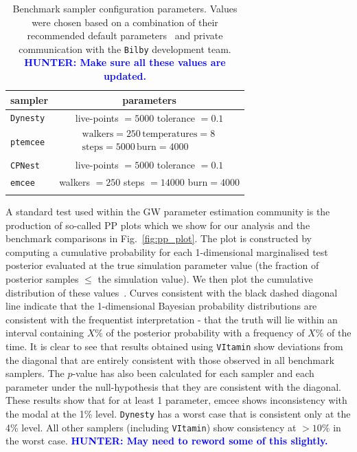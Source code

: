 \documentclass[%
showpacs,
nofootinbib,
 amsmath,amssymb,
 aps,
 twocolumn,
 prl,
 reprint,
floatfix,
]{revtex4-1}
\newcommand{\hunter}[1]{\textbf{\textcolor{blue}{HUNTER: #1}}}
\begin{document}
%
%
\begin{table}
\centering
\caption{Benchmark sampler configuration parameters. Values were chosen based
on a combination of their recommended default parameters~\cite{1811.02042} and
private communication with the \texttt{Bilby} development team.  \hunter{Make sure 
all these values are updated.}}
\begin{tabular}[t]{lc}
\toprule
sampler & parameters \\
\hline
\texttt{Dynesty}~\cite{dynesty} & live-points $=5000$ tolerance $=0.1$ \\
\texttt{ptemcee}~\cite{ptemcee} & $\begin{array}{c}\text{walkers}=250\,
\text{temperatures}=8\,
\\ \text{steps}=5000\, \text{burn}=4000\end{array}$ \\
\texttt{CPNest}~\cite{cpnest} & live-points $=5000$ tolerance $=0.1$ \\
\texttt{emcee}~\cite{emcee} & walkers $=250$ steps $=14000$ burn$=4000$ \\
\botrule
\end{tabular}
\label{Tab:sampler_params}
\end{table}

%
%
A standard test used within the \ac{GW} parameter estimation community is the
production of so-called \ac{PP} plots which we show for our analysis and
the benchmark comparisons in Fig.~\ref{fig:pp_plot}. The plot is constructed
by computing a cumulative probability for each 1-dimensional marginalised
test posterior evaluated at the true simulation parameter value (the fraction
of posterior samples $\leq$ the simulation value). We then plot the
cumulative distribution of these values~\cite{1409.7215}. Curves consistent
with the black dashed diagonal line indicate that the 1-dimensional Bayesian
probability distributions are consistent with the frequentist interpretation -
that the truth will lie within an interval containing $X\%$ of the posterior
probability with a frequency of $X\%$ of the time. It is clear to see that
results obtained using \texttt{VItamin} show deviations from the diagonal
that are entirely consistent with those observed in all benchmark samplers.
The $p$-value has also been calculated for each sampler and each parameter
under the null-hypothesis that they are consistent with the diagonal. These
results show that for at least 1 parameter, emcee shows inconsistency with the
modal at the 1\% level. \texttt{Dynesty} has a worst case that is consistent only at the
4\% level.  All other samplers (including \texttt{VItamin}) show consistency at
$>10\%$ in the worst case. \hunter{May need to reword some of this slightly.}    
\end{document}
